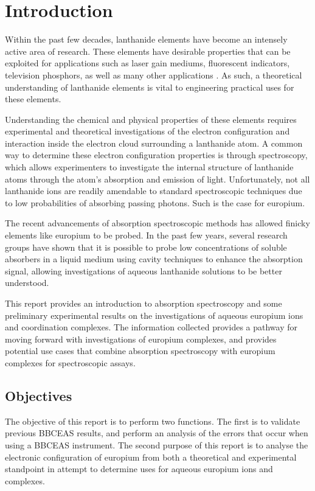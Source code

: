 \chapter*{Introduction}  \label{chap:intro}

Within the past few decades, lanthanide elements have become an intensely
active area of research. These elements have desirable properties that can be
exploited for applications such as laser gain mediums, fluorescent indicators,
television phosphors, as well as many other applications \cite{Bunzli:2005ic}.
As such, a theoretical understanding of lanthanide elements is vital to
engineering practical uses for these elements.

Understanding the chemical and physical properties of these elements requires
experimental and theoretical investigations of the electron configuration and
interaction inside the electron cloud surrounding a lanthanide atom. A common
way to determine these electron configuration properties is through
spectroscopy, which allows experimenters to investigate the internal structure
of lanthanide atoms through the atom's absorption and emission of light.
Unfortunately, not all lanthanide ions are readily amendable to standard
spectroscopic techniques due to low probabilities of absorbing passing
photons.  Such is the case for europium.

The recent advancements of absorption spectroscopic methods has allowed finicky
elements like europium to be probed. In the past few years, several research
groups have shown that it is possible to probe low concentrations of soluble
absorbers in a liquid medium using cavity techniques to enhance the absorption
signal, allowing investigations of aqueous lanthanide solutions to be better
understood.

This report provides an introduction to absorption spectroscopy and some
preliminary experimental results on the investigations of aqueous europium ions
and coordination complexes. The information collected provides a pathway for
moving forward with investigations of europium complexes, and provides
potential use cases that combine absorption spectroscopy with europium
complexes for spectroscopic assays.

\section*{Objectives}

The objective of this report is to perform two functions. The first is to
validate previous \ac{BBCEAS} results, and perform an analysis of the errors
that occur when using a \ac{BBCEAS} instrument. The second purpose of this
report is to analyse the electronic configuration of europium from both a
theoretical and experimental standpoint in attempt to determine uses for
aqueous europium ions and complexes.

